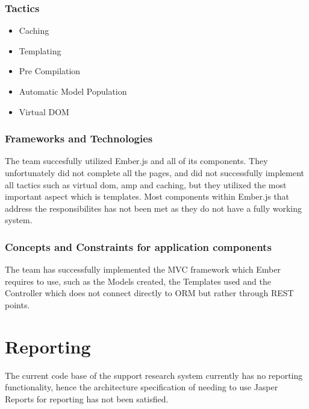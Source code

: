 \documentclass[a4paper,10pt]{article}
\begin{document}
    \subsubsection{Tactics}
      \begin{itemize}
        \item Caching
        \item Templating
        \item Pre Compilation
        \item Automatic Model Population
        \item Virtual DOM
      \end{itemize}
    \subsubsection{Frameworks and Technologies}
      The team succesfully utilized Ember.js and all of its components. They unfortunately did not complete all the pages, and did not successfully implement all tactics such as virtual dom, amp and caching, but they utilixed the most important aspect which is templates. Most components within Ember.js that address the responsibilites has not been met as they do not have a fully working system.
    \subsubsection{Concepts and Constraints for application components}
      The team has successfully implemented the MVC framework which Ember requires to use, such as the Models created, the Templates used and the Controller which does not connect directly to ORM but rather through REST points.

\section{Reporting}
The current code base of the support research system currently has no reporting functionality, hence the architecture specification of needing to use Jasper Reports for reporting has not been satisfied.
\end{document}
